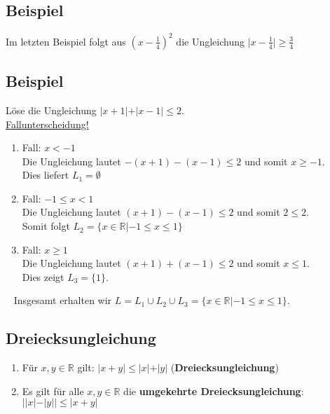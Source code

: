                 
\subsection{Beispiel}\label{betrag}

	Im letzten Beispiel folgt aus $\left( x-\frac{1}{4} \right)^2$ die Ungleichung 
	$\vert x-\frac{1}{4}\vert \geq \frac{3}{4}$
	
	
\subsection[Betragsungleichungen]{Beispiel}

	Löse die Ungleichung $\vert x+1 \vert + \vert x-1 \vert \leq 2$.\\ 
	
	\underline{Fallunterscheidung!} \newline
	
	\begin{enumerate}
	\item Fall: $x<-1$\\
	Die Ungleichung lautet $-(x+1)-(x-1)\leq 2$ und somit $x \geq -1$.\\
	Dies liefert $L_1=\emptyset$
	\item Fall: $-1 \leq x<1$\\
	Die Ungleichung lautet $(x+1)-(x-1)\leq 2$ und somit $2 \leq 2$.\\
	Somit folgt $L_2=\{ x\in \mathbb{R}|-1\leq x\leq 1 \}$
	\item Fall: $x\geq 1$\\
	Die Ungleichung lautet $(x+1)+(x-1)\leq 2$ und somit $x \leq 1$.\\
	Dies zeigt $L_3=\{1\}$.
	
	\end{enumerate}
	~\newline
	Insgesamt erhalten wir $L=L_1\cup L_2\cup L_3 = \{x\in\mathbb{R}|-1\leq x \leq 1 \}$.
	
	
\subsection{Dreiecksungleichung}

	\begin{enumerate}
	\item Für $x,y \in \mathbb{R}$ gilt: $\vert x+y \vert \leq \vert x \vert + \vert y \vert$
	(\textbf{Dreiecksungleichung})
	\item Es gilt für alle $x,y \in \mathbb{R}$ die \textbf{umgekehrte Dreiecksungleichung}:
	$\big\vert \vert x \vert - \vert y \vert \big\vert \leq \vert x+y\vert$
	\end{enumerate}
	
